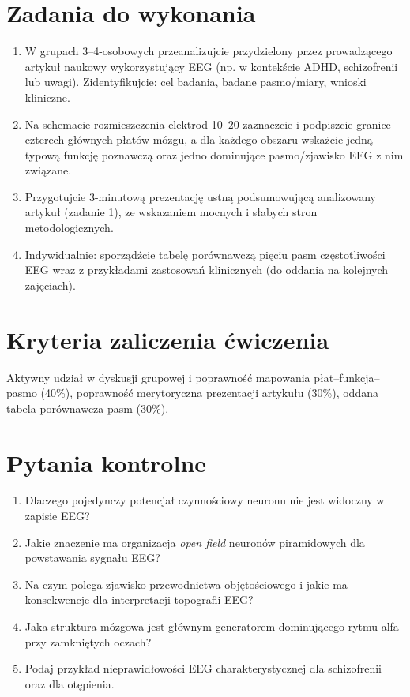 \documentclass[11pt,a4paper]{article}
\begin{document}
\section{Zadania do wykonania}
\begin{enumerate}[label=\textbf{Zadanie \arabic*.}, leftmargin=2.7cm]
  \item W grupach 3--4-osobowych przeanalizujcie przydzielony przez prowadzącego artykuł naukowy wykorzystujący EEG (np. w kontekście ADHD, schizofrenii lub uwagi). Zidentyfikujcie: cel badania, badane pasmo/miary, wnioski kliniczne.
  \item Na schemacie rozmieszczenia elektrod 10--20 zaznaczcie i podpiszcie granice czterech głównych płatów mózgu, a dla każdego obszaru wskażcie jedną typową funkcję poznawczą oraz jedno dominujące pasmo/zjawisko EEG z nim związane.
  \item Przygotujcie 3-minutową prezentację ustną podsumowującą analizowany artykuł (zadanie 1), ze wskazaniem mocnych i słabych stron metodologicznych.
  \item Indywidualnie: sporządźcie tabelę porównawczą pięciu pasm częstotliwości EEG wraz z przykładami zastosowań klinicznych (do oddania na kolejnych zajęciach).
\end{enumerate}

\section{Kryteria zaliczenia ćwiczenia}
Aktywny udział w dyskusji grupowej i poprawność mapowania płat--funkcja--pasmo (40\%), poprawność merytoryczna prezentacji artykułu (30\%), oddana tabela porównawcza pasm (30\%).

\section{Pytania kontrolne}
\begin{enumerate}[nosep]
  \item Dlaczego pojedynczy potencjał czynnościowy neuronu nie jest widoczny w zapisie EEG?
  \item Jakie znaczenie ma organizacja \emph{open field} neuronów piramidowych dla powstawania sygnału EEG?
  \item Na czym polega zjawisko przewodnictwa objętościowego i jakie ma konsekwencje dla interpretacji topografii EEG?
  \item Jaka struktura mózgowa jest głównym generatorem dominującego rytmu alfa przy zamkniętych oczach?
  \item Podaj przykład nieprawidłowości EEG charakterystycznej dla schizofrenii oraz dla otępienia.
\end{enumerate}
\end{document}
